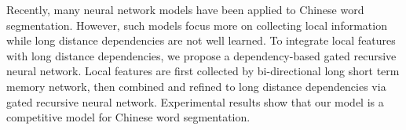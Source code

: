Recently, many neural network models have been applied to Chinese word segmentation. However, such models focus more on collecting local information while long distance dependencies are not well learned. To integrate local features with long distance dependencies, we propose a dependency-based gated recursive neural network. Local features are first collected by bi-directional long short term memory network, then combined and refined to long distance dependencies via gated recursive neural network. Experimental results show that our model is a competitive model for Chinese word segmentation.
